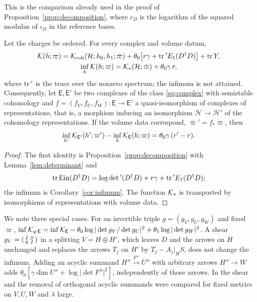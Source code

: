 This is the comparison already used in the proof of
Proposition~\ref{prop:decomposition}, where $c_D$ is the logarithm of the
squared modulus of $\iota_D$ in the reference bases.

\begin{theorem}\label{thm:infimum}
Let the charges be ordered. For every complex and volume datum,
\begin{gather*}
 \mathcal K(h;\varpi)=\mathcal K_{\mathrm{coh}}(\mathcal H;h_0,h_1;\bar\varpi)
 +\theta_0\bigl[r\gamma+\operatorname{tr}{}'E_1(D^\dagger D)\bigr]+\operatorname{tr} Y,\\
 \inf_h\mathcal K(h;\varpi)=\mathcal K_*(\mathcal H;\bar\varpi)+\theta_0\gamma\,r,
\end{gather*}
where $\operatorname{tr}{}'$ is the trace over the nonzero spectrum; the infimum is not
attained. Consequently, let $\mathsf E,\mathsf E'$ be two complexes of the
class \eqref{eq:complex} with semistable cohomology and
$f=(f_V,f_U,f_W):\mathsf E\to\mathsf E'$ a quasi-isomorphism of complexes of
representations, that is, a morphism inducing an isomorphism
$\mathcal H\to\mathcal H'$ of the cohomology representations. If the volume
data correspond, $\bar\varpi'=f_*\bar\varpi$, then
\[
 \inf_{h'}\mathcal K_{\mathsf E'}(h';\varpi')-\inf_h\mathcal K_{\mathsf E}(h;\varpi)=\theta_0\gamma\,(r'-r).
\]
\end{theorem}

\begin{proof}
The first identity is Proposition~\ref{prop:decomposition} with
Lemma~\ref{lem:determinant} and
\[
 \operatorname{tr}\operatorname{Ein}(D^\dagger D)=\log\det{}'(D^\dagger D)+r\gamma+\operatorname{tr}{}'E_1(D^\dagger D);
\]
the infimum is Corollary~\ref{cor:infimum}. The function $\mathcal K_*$ is
transported by isomorphisms of representations with volume data.
\end{proof}

We note three special cases. For an invertible triple $g=(g_V,g_U,g_W)$ and fixed
$\varpi$,
$\inf\mathcal K_{g\cdot\mathsf E}=\inf\mathcal K_{\mathsf E}-\theta_0\log|\det g_V/\det g_U|^2+\theta_1\log|\det g_W|^2$.
A shear $g_V=\left(\begin{smallmatrix}I&S\\0&I\end{smallmatrix}\right)$ in
a splitting $V=H\oplus H'$, which leaves $D$ and the arrows on $H$ unchanged
and replaces the arrows $T_j$ on $H'$ by $T_j-A_j|_HS$, does not change the
infimum. Adding an acyclic summand $H''\xrightarrow{F''}U''$ with arbitrary
arrows $H''\to W$ adds
$\theta_0[\gamma\dim U''+\log|\det F''|^2]$, independently of those arrows.
In \cite[\S8.1]{wue26} the shear and the removal of orthogonal acyclic
summands were compared for fixed metrics on $V,U,W$ and $\lambda$ large.

